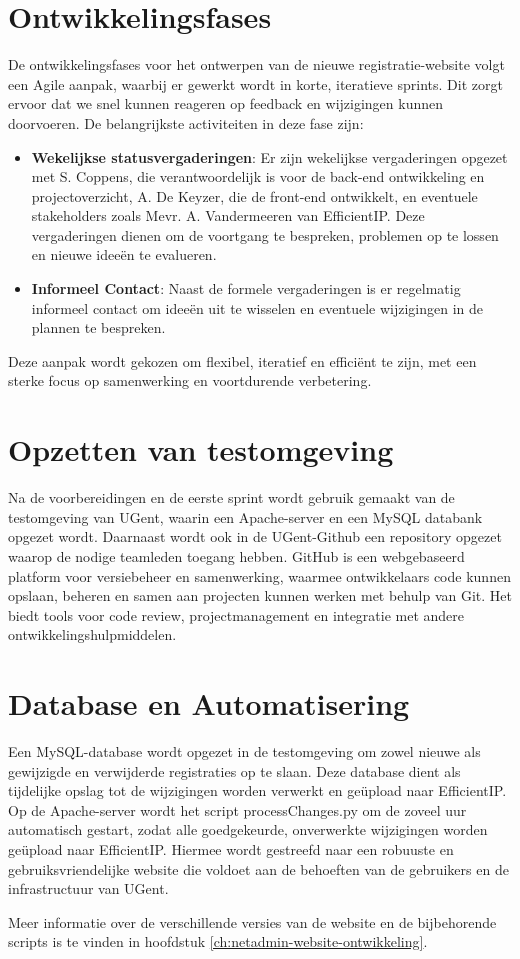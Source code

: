 \section{Ontwikkelingsfases}
De ontwikkelingsfases voor het ontwerpen van de nieuwe registratie-website volgt een Agile aanpak, waarbij er gewerkt wordt in korte, iteratieve sprints. Dit zorgt ervoor dat we snel kunnen reageren op feedback en wijzigingen kunnen doorvoeren. De belangrijkste activiteiten in deze fase zijn:
\begin{itemize}
    \item \textbf{Wekelijkse statusvergaderingen}: Er zijn wekelijkse vergaderingen opgezet met S. Coppens, die verantwoordelijk is voor de back-end ontwikkeling en \\projectoverzicht, A. De Keyzer, die de front-end ontwikkelt, en eventuele stakeholders zoals Mevr. A. Vandermeeren van EfficientIP. Deze vergaderingen dienen om de voortgang te bespreken, problemen op te lossen en nieuwe ideeën te evalueren.
    \item \textbf{Informeel Contact}: Naast de formele vergaderingen is er regelmatig informeel contact om ideeën uit te wisselen en eventuele wijzigingen in de plannen te bespreken.
\end{itemize}
Deze aanpak wordt gekozen om flexibel, iteratief en efficiënt te zijn, met een sterke focus op samenwerking en voortdurende verbetering. 

\section{Opzetten van testomgeving}
Na de voorbereidingen en de eerste sprint wordt gebruik gemaakt van de testomgeving van UGent, waarin een Apache-server en een MySQL databank opgezet wordt. 
Daarnaast wordt ook in de UGent-Github een repository opgezet waarop de nodige teamleden toegang hebben. GitHub is een webgebaseerd platform voor versiebeheer en samenwerking, waarmee ontwikkelaars code kunnen opslaan, beheren en samen aan projecten kunnen werken met behulp van Git. Het biedt tools voor code review, projectmanagement en integratie met andere ontwikkelingshulpmiddelen.

\section{Database en Automatisering}
Een MySQL-database wordt opgezet in de testomgeving om zowel nieuwe als gewijzigde en verwijderde registraties op te slaan. Deze database dient als tijdelijke opslag tot de wijzigingen worden verwerkt en geüpload naar EfficientIP. Op de Apache-server wordt het script processChanges.py om de zoveel uur automatisch gestart, zodat alle goedgekeurde, onverwerkte wijzigingen worden geüpload naar EfficientIP. Hiermee wordt gestreefd naar een robuuste en gebruiksvriendelijke website die voldoet aan de behoeften van de gebruikers en de infrastructuur van UGent.

Meer informatie over de verschillende versies van de website en de bijbehorende scripts is te vinden in hoofdstuk \ref{ch:netadmin-website-ontwikkeling}.

